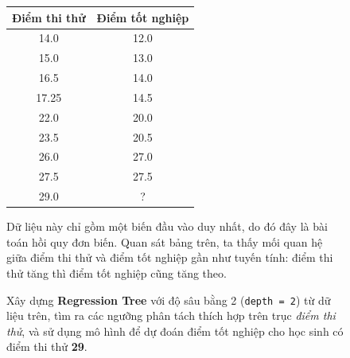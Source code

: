 \documentclass[12pt]{article}
\begin{document}
\begin{figure}[H]
\centering
\begin{minipage}{0.48\textwidth}
\centering
\renewcommand{\arraystretch}{1.3}
\setlength{\tabcolsep}{12pt}
\begin{tabular}{|c|c|}
\hline
\textbf{Điểm thi thử} & \textbf{Điểm tốt nghiệp} \\
\hline
14.0   & 12.0   \\ \hline
15.0   & 13.0   \\ \hline
16.5   & 14.0   \\ \hline
17.25  & 14.5   \\ \hline
22.0   & 20.0   \\ \hline
23.5   & 20.5   \\ \hline
26.0   & 27.0   \\ \hline
27.5   & 27.5   \\ \hline
29.0   & ?      \\ \hline
\end{tabular}
\label{tab:exam-graduation}
\end{minipage}
\hfill
\begin{minipage}{0.48\textwidth}
\RaggedRight
\begin{tcolorbox}[
  colback=gray!5!white,
  colframe=aivnGreen,
  fonttitle=\bfseries,
  title=\faInfoCircle\;Phân tích dữ liệu ban đầu,
  boxrule=0.8pt,
  arc=3pt
]
Dữ liệu này chỉ gồm một biến đầu vào duy nhất, do đó đây là bài toán hồi quy đơn biến.
Quan sát bảng trên, ta thấy mối quan hệ giữa điểm thi thử và điểm tốt nghiệp gần như tuyến tính: điểm thi thử tăng thì điểm tốt nghiệp cũng tăng theo.
\end{tcolorbox}

\vspace{0.8em}

\begin{tcolorbox}[
  colback=orange!7!white,
  colframe=orange!80!black,
  fonttitle=\bfseries,
  title=\faTasks\;Yêu cầu,
  boxrule=0.8pt,
  arc=3pt
]
Xây dựng \textbf{Regression Tree} với độ sâu bằng 2 (\texttt{depth = 2}) từ dữ liệu trên, tìm ra các ngưỡng phân tách thích hợp trên trục \emph{điểm thi thử}, và sử dụng mô hình để dự đoán điểm tốt nghiệp cho học sinh có điểm thi thử \textbf{29}.
\end{tcolorbox}

\end{minipage}
\end{figure}
\end{document}

